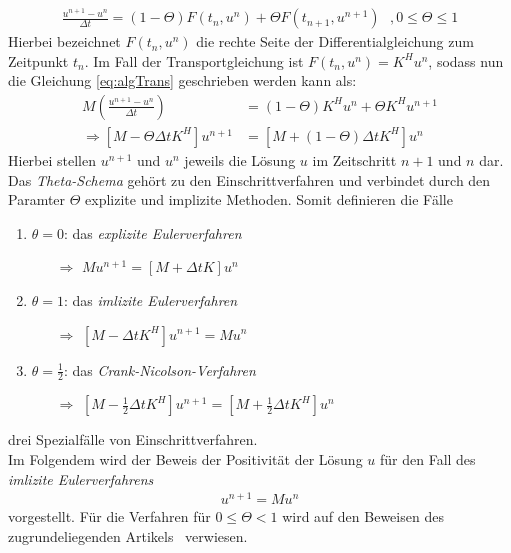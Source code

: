 \documentclass[12pt,titlepage]{article}
\begin{document}
\begin{align}
 \frac{u^{n+1}-u^n}{\Delta t}=(1-\Theta)F(t_n,u^n)+\Theta F(t_{n+1},u^{n+1})~~~,0\le\Theta\le1
\end{align}
Hierbei bezeichnet $F(t_n,u^n)$ die rechte Seite der Differentialgleichung zum Zeitpunkt $t_n$. Im Fall der Transportgleichung ist $F(t_n,u^n)=K^Hu^n$, sodass nun die Gleichung \eqref{eq:algTrans} geschrieben werden kann als:
\begin{align}
 M(\frac{u^{n+1}-u^n}{\Delta t})&=(1-\Theta)K^Hu^n+\Theta K^Hu^{n+1}\nonumber\\
\Rightarrow [M-\Theta\Delta tK^H]u^{n+1}&=[M+(1-\Theta)\Delta tK^H]u^n\label{eq:thetaGleich}
\end{align}
Hierbei stellen $u^{n+1}$ und $u^n$ jeweils die Lösung $u$ im Zeitschritt $n+1$  und $n$ dar. Das \textit{Theta-Schema} gehört zu den Einschrittverfahren und verbindet durch den Paramter $\Theta$ explizite und implizite Methoden. Somit definieren die Fälle
\begin{enumerate}
 \item $\theta=0$: das \textit{explizite Eulerverfahren}
 \begin{enumerate}
  \item[$\Rightarrow$] $Mu^{n+1}=[M+\Delta tK]u^n$
 \end{enumerate}
 \item $\theta=1$:    das \textit{imlizite Eulerverfahren}
 \begin{enumerate}
  \item[$\Rightarrow$] $[M-\Delta tK^H]u^{n+1}=Mu^n$
 \end{enumerate}
 \item $\theta=\frac{1}{2}$:  das \textit{Crank-Nicolson-Verfahren}
 \begin{enumerate}
  \item[$\Rightarrow$] $[M-\frac{1}{2}\Delta tK^H]u^{n+1}=[M+\frac{1}{2}\Delta tK^H]u^n$
 \end{enumerate}
\end{enumerate}
drei Spezialfälle von Einschrittverfahren.\\
Im Folgendem wird der Beweis der Positivität der Lösung $u$ für den Fall des \textit{imlizite Eulerverfahrens}
\begin{align}
 [M-\Delta tK^H]u^{n+1}=Mu^n\label{eq:LGS_H}
\end{align}
vorgestellt. Für die Verfahren für $0\le\Theta<1$ wird auf den Beweisen des zugrundeliegenden Artikels~\cite{kuzmin2002flux} verwiesen.\\
\end{document}
